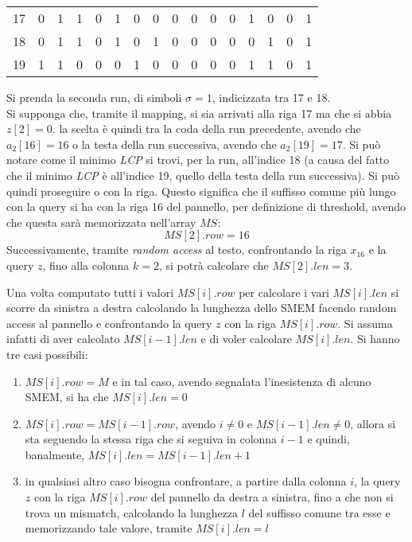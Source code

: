 \begin{esempio}
\begin{table}[H]
\begin{tabular}{c|cc|c|cccccccccccc}
      17 & 0 & 1 & 1 & 0 & 1 & 0 & 0 & 0 & 0 & 0 & 0 & 1 & 0 & 0 & 1 \\
      18 & 0 & 1 & 1 & 0 & 1 & 0 & 1 & 0 & 0 & 0 & 0 & 0 & 1 & 0 & 1 \\
      19 & 1 & 1 & 0 & 0 & 0 & 1 & 0 & 0 & 0 & 0 & 0 & 1 & 1 & 0 & 1 \\
    \end{tabular}
  \end{table}
  Si prenda la seconda run, di simboli $\sigma=1$, indicizzata tra 17 e 18. \\
  Si supponga che, tramite il mapping, si sia arrivati alla riga 17 ma che si
  abbia $z[2]=0$. la scelta è quindi tra la coda della run precedente, avendo
  che $a_2[16]=16$ o la testa della run successiva, avendo che $a_2[19]=17$. Si
  può notare come il minimo \textit{LCP} si trovi, per la 
  run, all'indice 18 (a causa del fatto che il minimo \textit{LCP} è all'indice
  19, quello della testa della run successiva). Si può quindi proseguire o con
  la riga. Questo significa che il suffisso comune più lungo con la query si ha
  con la riga 16 del pannello, per definizione di threshold, avendo che questa
  sarà memorizzata nell'array $MS$:
  \[MS[2].row=16\]
  Successivamente, tramite \textit{random access} al testo, confrontando la riga
  $x_{16}$ e la query $z$, fino alla colonna $k=2$, si potrà calcolare che
  $MS[2].len=3$. 
\end{esempio}
Una volta computato tutti i valori $MS[i].row$ per calcolare i vari $MS[i].len$
si scorre da sinistra a destra calcolando la lunghezza dello SMEM facendo random
access al pannello e confrontando la query $z$ con la riga $MS[i].row$. Si
assuma infatti di aver calcolato $MS[i-1].len$ e di voler calcolare $MS[i].len$.
Si hanno tre casi possibili:
\begin{enumerate}
  \item $MS[i].row=M$ e in tal caso, avendo segnalata l'inesistenza di alcuno
  SMEM, si ha che $MS[i].len=0$
  \item $MS[i].row=MS[i-1].row$, avendo $i\neq 0$ e $MS[i-1].len\neq 0$, allora
  si sta seguendo la stessa riga che si seguiva in colonna $i-1$ e quindi,
  banalmente, $MS[i].len=MS[i-1].len+1$
  \item in qualsiasi altro caso bisogna confrontare, a partire dalla colonna
  $i$, la query 
  $z$ con la riga $MS[i].row$ del pannello da destra a sinistra, fino a che non
  si trova un mismatch, calcolando la lunghezza $l$ del suffisso comune tra esse
  e memorizzando tale valore, tramite $MS[i].len=l$
\end{enumerate}
